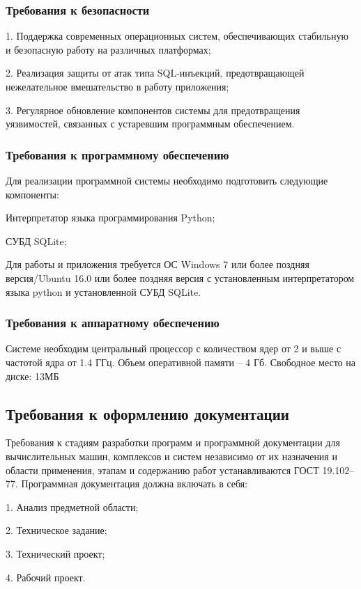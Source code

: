 \subsubsection{Требования к безопасности}
1. Поддержка современных операционных систем, обеспечивающих стабильную и безопасную работу на различных платформах;

2. Реализация защиты от атак типа SQL-инъекций, предотвращающей нежелательное вмешательство в работу приложения;

3. Регулярное обновление компонентов системы для предотвращения уязвимостей, связанных с устаревшим программным обеспечением.

\subsubsection{Требования к программному обеспечению}

Для реализации программной системы необходимо подготовить следующие компоненты:

Интерпретатор языка программирования Python; 

СУБД SQLite;

Для работы и приложения требуется ОС Windows 7 или более поздняя версия/Ubuntu 16.0 или более поздняя версия с установленным интерпретатором языка python и установленной СУБД SQLite.

\subsubsection{Требования к аппаратному обеспечению}
Системе необходим центральный процессор с количеством ядер от 2 и выше с частотой ядра от 1.4 ГГц. Объем оперативной памяти – 4 Гб.
Свободное место на диске: 13МБ

\subsection{Требования к оформлению документации}

Требования к стадиям разработки программ и программной документации для вычислительных машин, комплексов и систем независимо от их
назначения и области применения, этапам и содержанию работ устанавливаются ГОСТ 19.102–77. Программная документация должна включать в себя:

1. Анализ предметной области;

2. Техническое задание;

3. Технический проект;

4. Рабочий проект.

